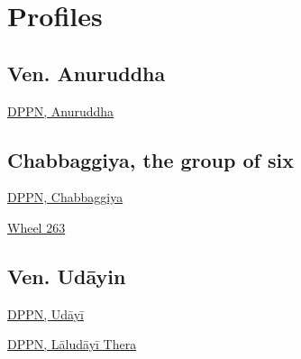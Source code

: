 \chapter{Profiles}

\section{Ven. Anuruddha}

\href{https://what-buddha-said.net/library/DPPN/ay/anuruddha.htm}{DPPN,
Anuruddha}

\section{Chabbaggiya, the group of six}

\href{https://what-buddha-said.net/library/DPPN/c/chabbaggiyaa.htm}{DPPN,
Chabbaggiya}

\href{https://what-buddha-said.net/library/ati_website/html/lib/authors/hecker/wheel263.html}{Wheel
263}

\section{Ven. Udāyin}

\href{https://what-buddha-said.net/library/DPPN/u/udaayii.htm}{DPPN,
Udāyī}

\href{https://what-buddha-said.net/library/DPPN/l/laludayi_th.htm}{DPPN,
Lāludāyī Thera}

